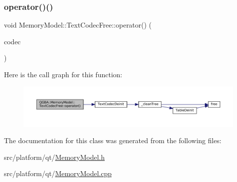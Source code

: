 \subsubsection{\texorpdfstring{operator()()}{operator()()}}
{\footnotesize\ttfamily void Memory\+Model\+::\+Text\+Codec\+Free\+::operator() (\begin{DoxyParamCaption}\item[{Text\+Codec $\ast$}]{codec }\end{DoxyParamCaption})}

Here is the call graph for this function\+:
\nopagebreak
\begin{figure}[H]
\begin{center}
\leavevmode
\includegraphics[width=350pt]{class_q_g_b_a_1_1_memory_model_1_1_text_codec_free_a141450e588f475dbc2c20585867cbfb3_cgraph}
\end{center}
\end{figure}


The documentation for this class was generated from the following files\+:\begin{DoxyCompactItemize}
\item 
src/platform/qt/\mbox{\hyperlink{_memory_model_8h}{Memory\+Model.\+h}}\item 
src/platform/qt/\mbox{\hyperlink{_memory_model_8cpp}{Memory\+Model.\+cpp}}\end{DoxyCompactItemize}
